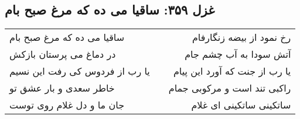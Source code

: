\begin{center}
\section*{غزل ۳۵۹: ساقیا می ده که مرغ صبح بام}
\label{sec:359}
\begin{longtable}{l p{0.5cm} r}
ساقیا می ده که مرغ صبح بام
&&
رخ نمود از بیضه زنگارفام
\\
در دماغ می پرستان بازکش
&&
آتش سودا به آب چشم جام
\\
یا رب از فردوس کی رفت این نسیم
&&
یا رب از جنت که آورد این پیام
\\
خاطر سعدی و بار عشق تو
&&
راکبی تند است و مرکوبی جمام
\\
جان ما و دل غلام روی توست
&&
ساتکینی ساتکینی ای غلام
\\
\end{longtable}
\end{center}
